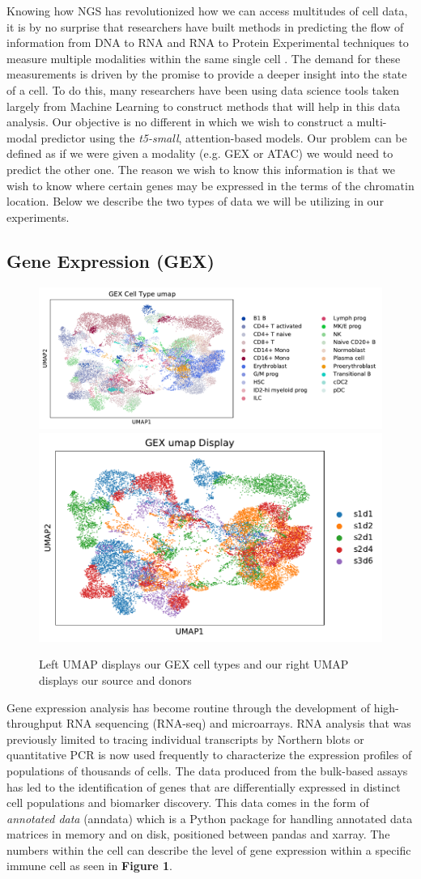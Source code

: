 Knowing how NGS has revolutionized how we can access multitudes of cell data, it is by no surprise that researchers have built methods in predicting the flow of information from DNA to RNA and RNA to Protein Experimental techniques to measure multiple modalities within the same single cell \cite{five}. 
The demand for these measurements is driven by the promise to provide a deeper insight into the state of a cell. 
To do this, many researchers have been using data science tools taken largely from Machine Learning to construct methods that will help in this data analysis.
Our objective is no different in which we wish to construct a multi-modal predictor using the \emph{t5-small}, attention-based models. 
Our problem can be defined as if we were given a modality (e.g. GEX or ATAC) we would need to predict the other one.
The reason we wish to know this information is that we wish to know where certain genes may be expressed in the terms of the chromatin location.
Below we describe the two types of data we will be utilizing in our experiments.

\subsection{Gene Expression (GEX)}
\begin{figure}[H]
\centering
\includegraphics[width=.5\textwidth]{figures/umap_GEX_ct.pdf}
\includegraphics[width=.35\textwidth]{figures/umap_GEX.pdf}
\caption{Left UMAP displays our GEX cell types and our right UMAP displays our source and donors}
\end{figure}

Gene expression analysis has become routine through the development of high-throughput RNA sequencing (RNA-seq) and microarrays. 
RNA analysis that was previously limited to tracing individual transcripts by Northern blots or quantitative PCR is now used frequently to characterize the expression profiles of populations of thousands of cells. 
The data produced from the bulk-based assays has led to the identification of genes that are differentially expressed in distinct cell populations and biomarker discovery. This data comes in the form of \emph{annotated data} (anndata) which is a Python package for handling annotated data matrices in memory and on disk, positioned between pandas and xarray. The numbers within the cell can describe the level of gene expression within a specific immune cell as seen in \textbf{Figure 1}.

